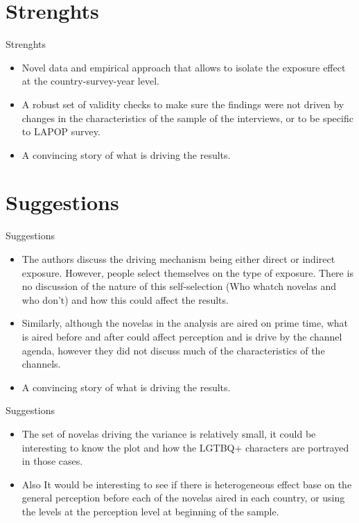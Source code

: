 \documentclass{beamer}
\begin{document}
\section{Strenghts}

    \begin{frame}{Strenghts}
    \begin{itemize}
        \item  Novel data and empirical approach that allows to isolate the exposure effect at the country-survey-year level.
         \vspace{0.3cm} 
        \pause 
         \item  A robust set of validity checks to make sure the findings were not driven by changes in the characteristics of the sample of the interviews, or to be specific to LAPOP survey.
       \vspace{0.3cm} 
        \pause 
        \item A convincing story of what is driving the results.
            \end{itemize}
    \end{frame}
\section{Suggestions}
    \begin{frame}{Suggestions}
    \begin{itemize}
        \item  The authors discuss the driving mechanism being either direct or indirect exposure. However, people select themselves on the type of exposure. There is no discussion of the nature of this self-selection (Who whatch novelas and who don't) and how this could affect the results.
         \vspace{0.3cm} 
        \pause 
         \item  Similarly, although the novelas in the analysis are aired on prime time, what is aired before and after could affect perception and is drive by the channel agenda, however they did not discuss much of the characteristics of the channels.
       \vspace{0.3cm} 
        \pause 
        \item A convincing story of what is driving the results.
            \end{itemize}
    \end{frame}
        \begin{frame}{Suggestions}
    \begin{itemize}
        \item  The set of novelas driving the variance is relatively small, it could be interesting to know the plot and how the LGTBQ+ characters are portrayed in those cases.
         \vspace{0.3cm} 
        \pause 
         \item Also It would be interesting to see if there is heterogeneous effect base on the general perception before each of the novelas aired in each country, or using the levels at the perception level at beginning of the sample.

            \end{itemize}
    \end{frame}
\end{document}
